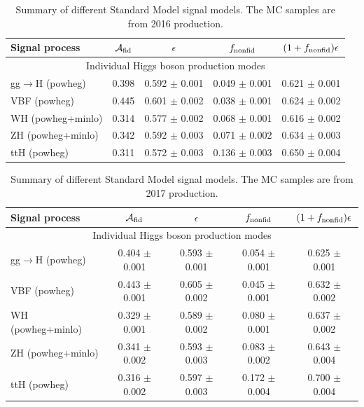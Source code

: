\begin{table}[!h!tb]
	\begin{center}
		\small
		\caption{
			Summary of different Standard Model signal models. The MC samples are from 2016 production.
			\label{tab:summarySM}
		}
		\begin{tabular}{|l|c|c|c|c|} \hline \hline 
			\textbf{Signal process} & $\mathcal{A}_{\rm fid}$ & $\epsilon$ & $f_{\rm nonfid}$  & $(1+f_{\rm nonfid})\epsilon$ \\ \hline \hline 
			\multicolumn{5}{|c|}{Individual Higgs boson production modes} \\ \hline 
			gg$\rightarrow$H ({\sc powheg})& 0.398 & 0.592 $\pm$ 0.001 & 0.049 $\pm$ 0.001 & 0.621 $\pm$ 0.001 \\ 
			VBF ({\sc powheg})& 0.445 & 0.601 $\pm$ 0.002 & 0.038 $\pm$ 0.001 & 0.624 $\pm$ 0.002 \\ 
			WH ({\sc powheg+minlo})& 0.314 & 0.577 $\pm$ 0.002 & 0.068 $\pm$ 0.001 & 0.616 $\pm$ 0.002 \\ 
			ZH ({\sc powheg+minlo})& 0.342 & 0.592 $\pm$ 0.003 & 0.071 $\pm$ 0.002 & 0.634 $\pm$ 0.003 \\ 
			ttH ({\sc powheg})& 0.311 & 0.572 $\pm$ 0.003 & 0.136 $\pm$ 0.003 & 0.650 $\pm$ 0.004 \\ 
			\hline \hline
		\end{tabular}
		\normalsize
	\end{center}
\end{table}



\begin{table}[!h!tb]
	\begin{center}
		\small
		\caption{
			Summary of different Standard Model signal models. The MC samples are from 2017 production.
			\label{tab:summarySM}
		}
		\begin{tabular}{|l|c|c|c|c|} \hline \hline 
			\textbf{Signal process} & $\mathcal{A}_{\rm fid}$ & $\epsilon$ & $f_{\rm nonfid}$  & $(1+f_{\rm nonfid})\epsilon$ \\ \hline \hline 
			\multicolumn{5}{|c|}{Individual Higgs boson production modes} \\ \hline 
 gg$\rightarrow$H ({\sc powheg}) & 0.404 $\pm$ 0.001 & 0.593 $\pm$ 0.001 & 0.054 $\pm$ 0.001 & 0.625 $\pm$ 0.001 \\ 
 VBF ({\sc powheg}) & 0.443 $\pm$ 0.001 & 0.605 $\pm$ 0.002 & 0.045 $\pm$ 0.001 & 0.632 $\pm$ 0.002 \\ 
 WH ({\sc powheg+minlo}) & 0.329 $\pm$ 0.001 & 0.589 $\pm$ 0.002 & 0.080 $\pm$ 0.001 & 0.637 $\pm$ 0.002 \\ 
 ZH ({\sc powheg+minlo}) & 0.341 $\pm$ 0.002 & 0.593 $\pm$ 0.003 & 0.083 $\pm$ 0.002 & 0.643 $\pm$ 0.004 \\ 
 ttH ({\sc powheg}) & 0.316 $\pm$ 0.002 & 0.597 $\pm$ 0.003 & 0.172 $\pm$ 0.004 & 0.700 $\pm$ 0.004 \\ 
			\hline \hline
		\end{tabular}
		\normalsize
	\end{center}
\end{table}


